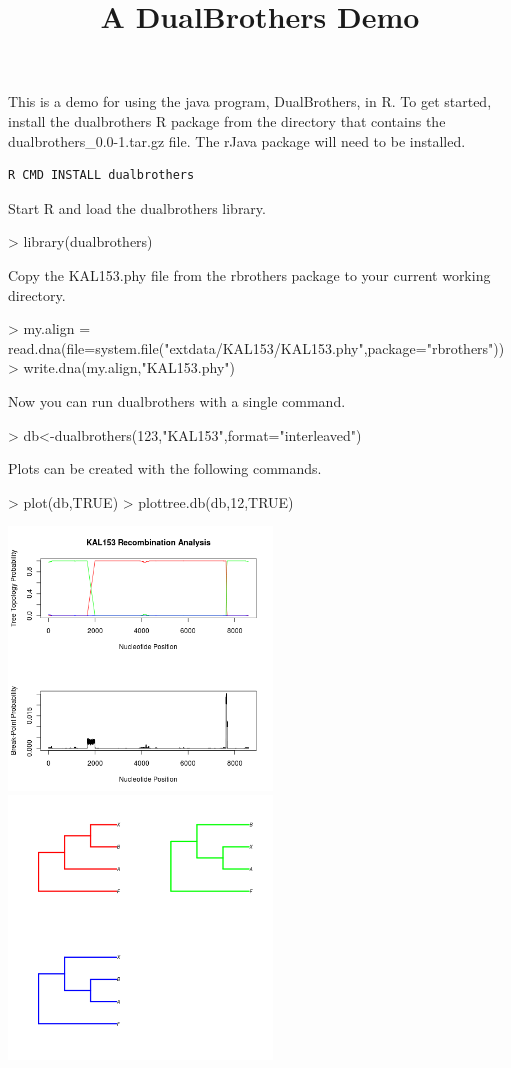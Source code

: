\documentclass{article}
\begin{document}
\title{A DualBrothers Demo}
\maketitle

This is a demo for using the java program, DualBrothers, in R.  To
get started, install the dualbrothers R package from the directory that contains the dualbrothers\_0.0-1.tar.gz file. The rJava package will need to be installed.
\begin{verbatim}
R CMD INSTALL dualbrothers
\end{verbatim}

Start R and load the dualbrothers library.

\begin{Schunk}
\begin{Sinput}
> library(dualbrothers)
\end{Sinput}
\end{Schunk}

Copy the KAL153.phy file from the rbrothers package to your current working directory.
\begin{Schunk}
\begin{Sinput}
> my.align = read.dna(file=system.file("extdata/KAL153/KAL153.phy",package="rbrothers"))
> write.dna(my.align,"KAL153.phy")
\end{Sinput}
\end{Schunk}

Now you can run dualbrothers with a single command.
\begin{Schunk}
\begin{Sinput}
> db<-dualbrothers(123,"KAL153",format="interleaved")
\end{Sinput}
\end{Schunk}

Plots can be created with the following commands.
\begin{Schunk}
\begin{Sinput}
> plot(db,TRUE)
> plottree.db(db,12,TRUE)
\end{Sinput}
\end{Schunk}

\includegraphics[width=70mm]{KAL153plot1.png}
\includegraphics[width=70mm]{KAL153plot2.png}
\end{document}
